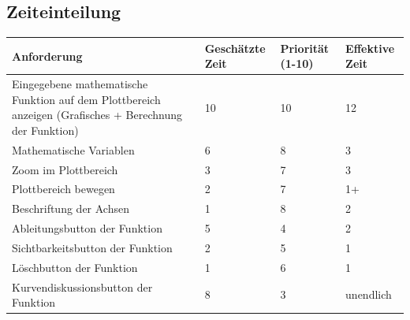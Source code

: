 \documentclass[a4paper]{article}
\begin{document}
\subsection{Zeiteinteilung}
\begin{table}[h]
	\centering
	\begin{tabular}{|p{5cm}|p{2cm}|p{2cm}|p{2cm}|}
		\hline
		\textbf{Anforderung}                                                                                    & \textbf{Geschätzte Zeit} & \textbf{Priorität (1-10)} & \textbf{Effektive Zeit} \\
		\hline
		Eingegebene mathematische Funktion auf dem Plottbereich anzeigen (Grafisches + Berechnung der Funktion) & 10                       & 10                        & 12                      \\
		\hline
		Mathematische Variablen                                                                                 & 6                        & 8                         & 3                       \\
		\hline
		Zoom im Plottbereich                                                                                    & 3                        & 7                         & 3                       \\
		\hline
		Plottbereich bewegen                                                                                    & 2                        & 7                         & 1+                      \\
		\hline
		Beschriftung der Achsen                                                                                 & 1                        & 8                         & 2                       \\
		\hline
		Ableitungsbutton der Funktion                                                                           & 5                        & 4                         & 2                       \\
		\hline
		Sichtbarkeitsbutton der Funktion                                                                        & 2                        & 5                         & 1                       \\
		\hline
		Löschbutton der Funktion                                                                                & 1                        & 6                         & 1                       \\
		\hline
		Kurvendiskussionsbutton der Funktion                                                                    & 8                        & 3                         & unendlich               \\

\end{tabular}
\end{table}
\end{document}
